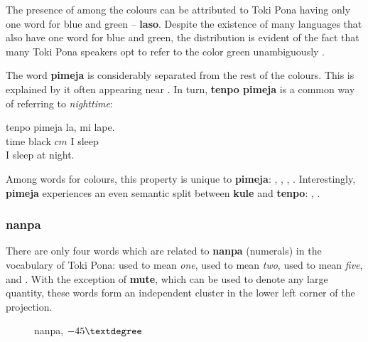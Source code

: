 \documentclass[14pt, a4paper]{extreport}
\makeatletter
\DeclareRobustCommand\ttfamily
        {\not@math@alphabet\ttfamily\mathtt
         \fontfamily\ttdefault\small\selectfont}
\makeatother
\begin{document}
The presence of  among the colours can be attributed to Toki Pona having only one word for blue and green -- \textbf{laso}. Despite the existence of many languages that also have one word for blue and green, the distribution is evident of the fact that many Toki Pona speakers opt to refer to the color green unambiguously .

The word \textbf{pimeja} is considerably separated from the rest of the colours. This is explained by it often appearing near . In turn, \textbf{tenpo pimeja} is a common way of referring to \textit{nighttime}:

\begin{exe}
  \ex
  \gll tenpo pimeja la, mi lape. \\
       time black $cm$ I sleep \\
  \glt I sleep at night.
\end{exe}

Among words for colours, this property is unique to \textbf{pimeja}: , , , . Interestingly, \textbf{pimeja} experiences an even semantic split between \textbf{kule} and \textbf{tenpo}: , .
      \subsubsection{nanpa}
There are only four words which are related to \textbf{nanpa} (numerals) in the vocabulary of Toki Pona:  used to mean \textit{one},  used to mean \textit{two},  used to mean \textit{five}, and . With the exception of \textbf{mute}, which can be used to denote any large quantity, these words form an independent cluster in the lower left corner of the projection.

\begin{figure}[ht]%
  \def\angle{-45}
  \bigskip
  \centering
  \caption{nanpa, \(\angle\textdegree\)}
\end{figure}%
\end{document}
